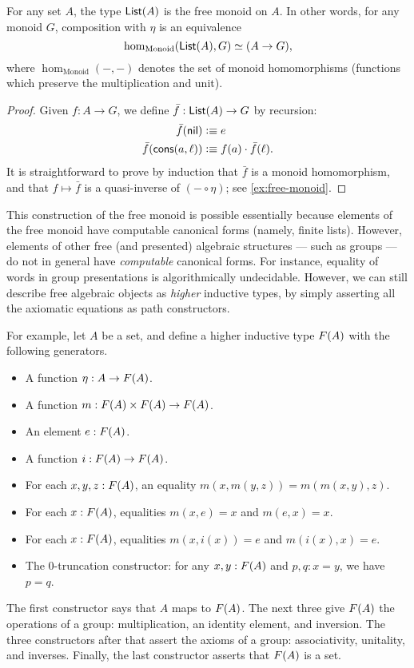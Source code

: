 \begin{lem}\label{thm:free-monoid}
  For any set $A$, the type $\mathsf{List}(A)$ is the free monoid on $A$.
  In other words, for any monoid $G$, composition with $\eta$ is an equivalence
  \[ \hom_{\mathrm{Monoid}}(\mathsf{List}(A),G) \simeq (A\to G), \]
  where $\hom_{\mathrm{Monoid}}(-,-)$ denotes the set of monoid homomorphisms (functions which preserve the multiplication and unit).
\end{lem}
\begin{proof}
  Given $f:A\to G$, we define $\bar{f}:\mathsf{List}(A) \to G$ by recursion:
  \begin{align*}
    \bar{f}(\mathsf{nil}) &\vcentcolon\equiv e\\
    \bar{f}(\mathsf{cons}(a,\ell)) &\vcentcolon\equiv f(a) \cdot \bar{f}(\ell).
  \end{align*}
  It is straightforward to prove by induction that $\bar{f}$ is a monoid homomorphism, and that $f\mapsto \bar f$ is a quasi-inverse of $(-\circ \eta)$; see \autoref{ex:free-monoid}.
\end{proof}

This construction of the free monoid is possible essentially because elements of the free monoid have computable canonical forms (namely, finite lists).
However, elements of other free (and presented) algebraic structures --- such as groups --- do not in general have \emph{computable} canonical forms.
For instance, equality of words in group presentations is algorithmically undecidable.
However, we can still describe free algebraic objects as \emph{higher} inductive types, by simply asserting all the axiomatic equations as path constructors.

For example, let $A$ be a set, and define a higher inductive type $F(A)$ with the following generators.
\begin{itemize}
\item A function $\eta:A\to F(A)$.
\item A function $m: F(A) \times F(A) \to F(A)$.
\item An element $e:F(A)$.
\item A function $i:F(A) \to F(A)$.
\item For each $x,y,z:F(A)$, an equality $m(x,m(y,z)) = m(m(x,y),z)$.
\item For each $x:F(A)$, equalities $m(x,e) = x$ and $m(e,x) = x$.
\item For each $x:F(A)$, equalities $m(x,i(x)) = e$ and $m(i(x),x) = e$.
\item The $0$-truncation constructor: for any $x,y:F(A)$ and $p,q:x=y$, we have $p=q$.
\end{itemize}
The first constructor says that $A$ maps to $F(A)$.
The next three give $F(A)$ the operations of a group: multiplication, an identity element, and inversion.
The three constructors after that assert the axioms of a group: associativity, unitality, and inverses.
Finally, the last constructor asserts that $F(A)$ is a set.

